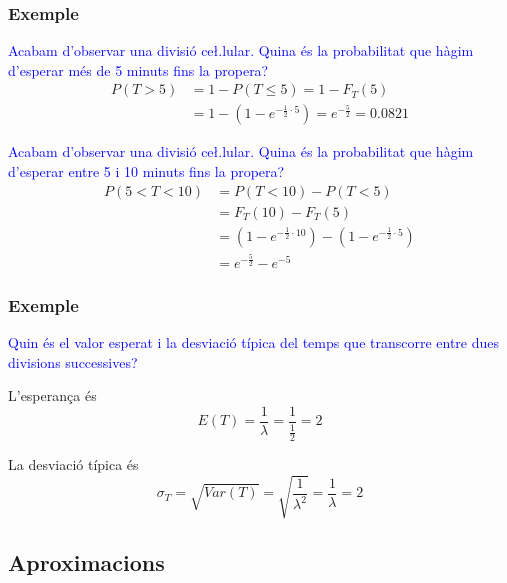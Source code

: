 \documentclass[12pt,t]{beamer}\usepackage[]{graphicx}\usepackage[]{color}
\newcommand{\blue}[1]{\textcolor{blue}{#1}}
\renewcommand{\leq}{\leqslant}
\theoremstyle{plain}
\theoremstyle{definition}
\begin{document}
\begin{frame}
\frametitle{Exemple}

\blue{Acabam d'observar una divisió ce\l.lular. Quina és la probabilitat que hàgim d'esperar més de 5 minuts fins la propera?}
\pause
$$
\begin{array}{rl}
P(T>5) & =1-P(T\leq 5)=1-F_T(5)\\ & =1-(1-e^{-\frac{1}{2}\cdot 5}) =
e^{-\frac{5}{2}}=0.0821
\end{array}
$$
\pause

\blue{Acabam d'observar una divisió ce\l.lular. Quina és la probabilitat que hàgim d'esperar entre 5 i 10  minuts fins la propera?}
\pause
$$
\begin{array}{rl}
P(5<T<10)  & =P(T<10)-P(T<5)\\ &=F_T(10)-F_T(5)\\ & =(1-e^{-\frac{1}{2}\cdot 10})-(1-e^{-\frac{1}{2}\cdot 5})\\ & =e^{-\frac{5}{2}}-e^{-5}
\end{array}
$$



\end{frame}




\begin{frame}
\frametitle{Exemple}

\blue{Quin és el valor esperat i la desviació típica  del temps que transcorre entre dues divisions successives?}
\medskip

L'esperança és
$$
E(T)=\frac{1}{\lambda}=\frac{1}{\frac{1}{2}}=2
$$

La desviació típica és
$$
\sigma_T=\sqrt{Var(T)}=\sqrt{\frac{1}{\lambda^2}}=\frac{1}{\lambda}=2
$$


\end{frame}



 
\subsection{Aproximacions}
 
\end{document}
